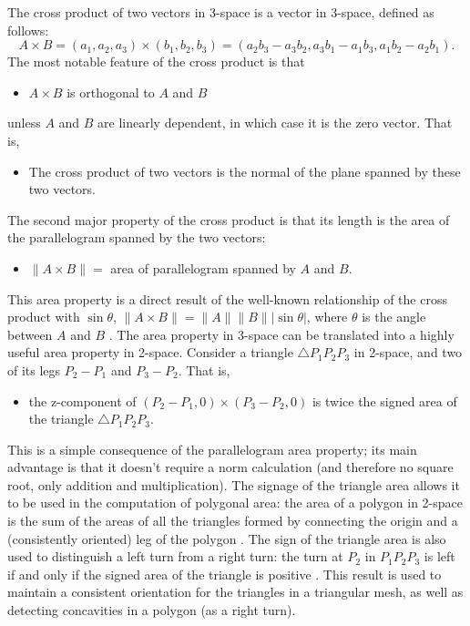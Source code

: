 \documentclass[10pt]{article}
\newif\iftalk
\begin{document}
\iftalk
3 vector products: inner product, outer product, cross product
\fi

The cross product of two vectors in 3-space is a vector in 3-space, defined as follows:
\[
  A \times B = (a_1,a_2,a_3) \times (b_1,b_2,b_3) 
             = (a_2b_3 - a_3b_2, a_3b_1 - a_1b_3, a_1b_2 - a_2b_1).
\]
The most notable feature of the cross product is that 
\begin{itemize}
\item $A \times B$ is orthogonal to $A$ and $B$
\end{itemize}
unless $A$ and $B$ are linearly dependent, in which case it is the zero vector.
That is, 
\begin{itemize}
\item The cross product of two vectors is the normal of the plane spanned by these two vectors.
\end{itemize}
The second major property of the cross product is that its length 
is the area of the parallelogram spanned by the two vectors:
\begin{itemize}
\item $\|A \times B\| =$ area of parallelogram spanned by $A$ and $B$.
\end{itemize}
This area property is a direct result of the well-known relationship of the cross product with
$\sin\theta$, $\|A \times B\| = \|A\| \|B\| |\sin\theta|$, 
where $\theta$ is the angle between $A$ and $B$ \cite{lang71}. %
The area property in 3-space can be translated into a highly useful area property
in 2-space.
Consider a triangle $\bigtriangleup P_1P_2P_3$ in 2-space, 
and two of its legs $P_2 - P_1$ and $P_3 - P_2$.
That is, 
\begin{itemize}
\item the z-component of $(P_2 - P_1, 0) \times (P_3 - P_2, 0)$ is twice the signed area
of the triangle $\bigtriangleup P_1P_2P_3$.
\end{itemize}
This is a simple consequence of the parallelogram area property;
its main advantage is that it doesn't require a norm calculation (and therefore no square root,
only addition and multiplication).
%
The signage of the triangle area allows it to be used in the computation of polygonal area:
the area of a polygon in 2-space is the sum of the areas of all the triangles formed by 
connecting the origin and a (consistently oriented) leg of the polygon \cite{orourke94}.
The sign of the triangle area is also used to distinguish a left turn from a right turn:
the turn at $P_2$ in $P_1P_2P_3$ is left if and only if the signed area of the triangle is positive
\cite{orourke94}.%
This result is used to maintain a consistent orientation for the triangles in a triangular mesh,
as well as detecting concavities in a polygon (as a right turn).
\end{document}
